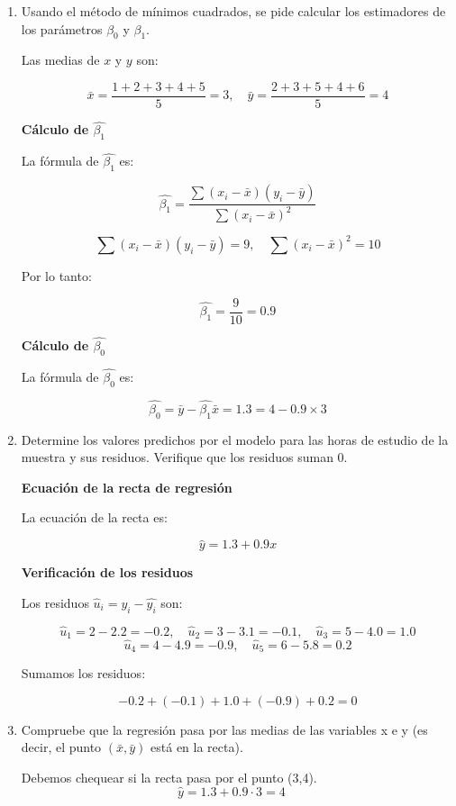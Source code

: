 \documentclass[10pt,a4paper]{article}
\begin{document}
\begin{enumerate}
    \item  Usando el método de mínimos cuadrados, se pide calcular los estimadores de los parámetros \( \beta_0 \) y \( \beta_1 \). 

{\color{red}    Las medias de \(x\) y \(y\) son:

\[
\bar{x} = \frac{1+2+3+4+5}{5} = 3, \quad \bar{y} = \frac{2+3+5+4+6}{5} = 4
\]

{\bf Cálculo de \( \hat{\beta_1} \)}

La fórmula de \( \hat{\beta_1 }\) es:

\[
\hat{\beta_1 }= \frac{\sum (x_i - \bar{x})(y_i - \bar{y})}{\sum (x_i - \bar{x})^2}
\]

\[
\sum (x_i - \bar{x})(y_i - \bar{y}) = 9, \quad \sum (x_i - \bar{x})^2 = 10
\]

Por lo tanto:

\[
\hat{\beta_1} = \frac{9}{10} = 0.9
\]

{\bf Cálculo de \(\hat{ \beta_0} \)}

La fórmula de \( \hat{\beta_0} \) es:

\[
\hat{\beta_0} = \bar{y} - \hat{\beta_1 }\bar{x} = 1.3 =4- 0.9 \times 3 
\]}

     \item Determine los valores predichos por el modelo para las horas de estudio de la muestra y sus  residuos. Verifique que los residuos suman 0.

{\color{red}
{\bf Ecuación de la recta de regresión}

La ecuación de la recta es:

\[
\hat{y} = 1.3 + 0.9x
\]

{\bf Verificación de los residuos}

Los residuos \( \hat{u}_i = y_i - \hat{y_i} \) son:

\[
\hat{u}_1 = 2 - 2.2 = -0.2, \quad \hat{u}_2 = 3 - 3.1 = -0.1, \quad \hat{u}_3 = 5 - 4.0 = 1.0
\]
\[
\hat{u}_4 = 4 - 4.9 = -0.9, \quad \hat{u}_5 = 6 - 5.8 = 0.2
\]

Sumamos los residuos:

\[
-0.2 + (-0.1) + 1.0 + (-0.9) + 0.2 = 0
\]}
     
    \item  Compruebe que la regresión pasa por las medias de las variables x e y (es decir, el punto $(\bar{x}, \bar{y})$ está en la recta).

    {\color{red}

Debemos chequear si la recta pasa por el punto (3,4).
    \[
\hat{y} = 1.3 + 0.9\cdot 3=4  \quad 
\]}



\end{enumerate}
\end{document}
